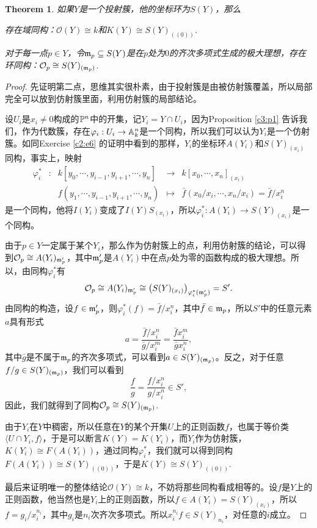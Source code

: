 \documentclass[9pt]{extarticle}
\theoremstyle{plain}%
\newtheorem{theo}[defi]{Theorem}%
\begin{document}
\begin{theo}
	如果$Y$是一个投射簇，他的坐标环为$S(Y)$，那么

	 存在域同构：$\mathcal{O}(Y)\cong k$和$K(Y)\cong S(Y)_{((0))}$.

	 对于每一点$p\in Y$，令$\mathfrak{m}_p\subseteq S(Y)$是在$p$处为$0$的齐次多项式生成的极大理想，存在环同构：$\mathcal{O}_p\cong S(Y)_{(\mathfrak{m}_p)}$.
\end{theo}
\begin{proof}
	先证明第二点，思维其实很朴素，由于投射簇是由被仿射簇覆盖，所以局部完全可以放到仿射簇里面，利用仿射簇的局部结论。

	设$U_i$是$x_i\neq 0$构成的$\mathbb{P}^n$中的开集，记$Y_i=Y\cap U_i$，因为Proposition \ref{c3:p1} 告诉我们，作为代数簇，存在$\varphi_i:U_i\to \mathbb{A}^n_k$是一个同构，所以我们可以认为$Y_i$是一个仿射簇。如同Exercise \ref{c2:e6} 的证明中看到的那样，$Y_i$的坐标环$A(Y_i)$和$S(Y)_{(x_i)}$同构，事实上，映射
	\[
	\begin{array}{lcccl}
		\varphi^*_i&:&k[y_0,\cdots,y_{i-1},y_{i+1},\cdots,y_n]&\to& k[x_0,\cdots,x_n]_{(x_i)}\\
		&&f(y_1,\cdots,y_{i-1},y_{i+1},\cdots,y_n)&\mapsto &\bar{f}(x_0/x_i,\cdots,x_n/x_i)=\bar{f}/x_i^n
	\end{array}
	\]
	是一个同构，他将$I(Y_i)$变成了$I(Y)S_{(x_i)}$，所以$\varphi^*_i:A(Y_i)\to S(Y)_{(x_i)}$是一个同构。

	由于$p\in Y$一定属于某个$Y_i$，那么作为仿射簇上的点，利用仿射簇的结论，可以得到$\mathcal{O}_p\cong A(Y_i)_{\mathfrak{m}'_p}$，其中$\mathfrak{m}'_p$是$A(Y_i)$中在点$p$处为零的函数构成的极大理想。所以，由同构$\varphi^*_i$有
	\[
		\mathcal{O}_p\cong A(Y_i)_{\mathfrak{m}'_p}\cong \bigl(S(Y)_{(x_i)}\bigr)_{\varphi^*_i(\mathfrak{m}'_p)}=S'.
	\]
	由同构的构造，设$f\in \mathfrak{m}'_p$，则$\varphi^*_i(f)=\bar{f}/x_i^n$，其中$\bar{f}\in \mathfrak{m}_p$，所以$S'$中的任意元素$a$具有形式
	\[
		a=\frac{\bar{f}/x_i^n}{{\bar{g}/x_i^m}}=\frac{\bar{f} x_i^m}{\bar{g} x_i^n},
	\]
	其中$\bar{g}$是不属于$\mathfrak{m}_p$的齐次多项式，可以看到$a\in S(Y)_{(\mathfrak{m}_p)}$。反之，对于任意$f/g\in S(Y)_{(\mathfrak{m}_p)}$，我们可以看到
	\[
		\frac{f}{g}=\frac{f/x_i^n}{g/x_i^n}\in S',
	\]
	因此，我们就得到了同构$\mathcal{O}_p\cong S(Y)_{(\mathfrak{m}_p)}$.

	由于$Y_i$在$Y$中稠密，所以任意在$Y$的某个开集$U$上的正则函数$f$，也属于等价类$\langle U\cap Y_i,f\rangle$，于是可以断言$K(Y)=K(Y_i)$，而$Y_i$作为仿射簇，$K(Y_i)\cong F(A(Y_i))$，通过同构$\varphi^*_i$，我们就可以得到同构$F(A(Y_i))\cong S(Y)_{((0))}$，于是$K(Y) \cong S(Y)_{((0))}$.

	最后来证明唯一的整体结论$\mathcal{O}(Y)\cong k$，不妨将那些同构看成相等的。设$f$是$Y$上的正则函数，他当然也是$Y_i$上的正则函数，所以$f\in A(Y_i)= S(Y)_{(x_i)}$，所以$f=g_i/x_i^{n_i}$，其中$g_i$是$n_i$次齐次多项式。所以$x_i^{n_i}f\in S(Y)_{n_i}$，对任意的$i$成立。


\end{proof}
\end{document}
